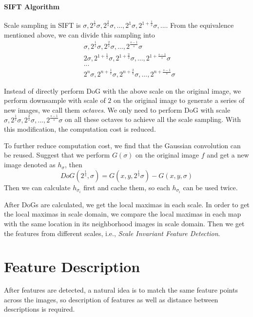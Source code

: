 \documentclass[runningheads]{llncs}
\begin{document}
\paragraph{SIFT Algorithm}
Scale sampling in SIFT is $\sigma, 2^{\frac{1}{s}}\sigma, 2^{\frac{2}{s}}\sigma,..., 2^1\sigma, 2^{1+\frac{1}{s}}\sigma,...$.
From the equivalence mentioned above, we can divide this sampling into
\begin{align*}
    &\sigma, 2^{\frac{1}{s}}\sigma, 2^{\frac{2}{s}}\sigma,...,2^{\frac{s-1}{s}}\sigma \\
    &2\sigma, 2^{1+\frac{1}{s}}\sigma, 2^{1+\frac{2}{s}}\sigma,...,2^{1+\frac{s-1}{s}}\sigma \\
    &...\\
    &2^n\sigma, 2^{n+\frac{1}{s}}\sigma, 2^{n+\frac{2}{s}}\sigma,..., 2^{n+\frac{s-1}{s}}\sigma
\end{align*}
\par
Instead of directly perform DoG with the above scale on the original image,
we perform downsample with scale of $2$ on the original image to generate
a series of new images, we call them \emph{octaves}.
We only need to perform DoG with scale $\sigma, 2^{\frac{1}{s}}\sigma, 2^{\frac{2}{s}}\sigma,...,2^{\frac{s-1}{s}}\sigma$
on all these octaves to achieve all the scale sampling.
With this modification, the computation cost is reduced.
\par
To further reduce computation cost,
we find that the Gaussian convolution can be reused.
Suggest that we perform $G(\sigma)$ on the original image $f$
and get a new image denoted as $h_{\sigma}$,
then 
$$DoG(2^{\frac{1}{s}}, \sigma) = G(x, y, 2^{\frac{1}{s}}\sigma) - G(x, y, \sigma)$$
Then we can calculate $h_{\sigma_i}$ first and cache them,
so each $h_{\sigma_i}$ can be used twice.
\par
After DoGs are calculated, we get the local maximas in each scale.
In order to get the local maximas in scale domain,
we compare the local maximas in each map with the same location in
its neighborhood images in scale domain.
Then we get the features from different scales, i.e., \emph{Scale Invariant Feature Detection}.

\section{Feature Description}
After features are detected, a natural idea is to match the same
feature points across the images, so description of features
as well as distance between descriptions is required.
\end{document}

